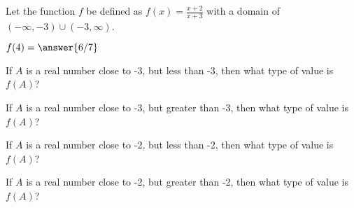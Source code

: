 \documentclass{ximera}
\begin{document}
\begin{definition}
Let the function $f$ be defined as $f(x) = \frac{x+2}{x+3}$ with a domain of $(-\infty, -3) \cup (-3, \infty)$. 

\end{definition}




\begin{exercise}
$f(4) = \answer{6/7} $ 
\end{exercise}





\begin{exercise}
If $A$ is a real number close to -3, but less than -3, then what type of value is $f(A)$?

\begin{multipleChoice}
\end{multipleChoice}

\end{exercise}



\begin{exercise}
If $A$ is a real number close to -3, but greater than -3, then what type of value is $f(A)$?

\begin{multipleChoice}
\end{multipleChoice}

\end{exercise}



\begin{exercise}
If $A$ is a real number close to -2, but less than -2, then what type of value is $f(A)$?

\begin{multipleChoice}
\end{multipleChoice}

\end{exercise}




\begin{exercise}
If $A$ is a real number close to -2, but greater than -2, then what type of value is $f(A)$?

\begin{multipleChoice}
\end{multipleChoice}

\end{exercise}
\end{document}

